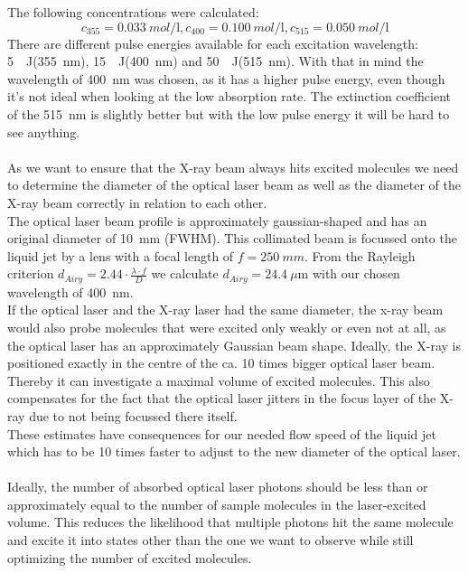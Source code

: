 \documentclass[10pt,a4paper, bibliography=totoc]{scrartcl}
\begin{document}
The following concentrations were calculated:
$$c_{355}=\qty{0.033}{mol\per\l}, c_{400}=\qty{0.100}{mol\per\l}, c_{515}=\qty{0.050}{mol\per\l}$$
There are different pulse energies available for each excitation wavelength: \qty{5}{\mu\J}(\qty{355}{nm}), \qty{15}{\mu\J}(\qty{400}{nm}) and \qty{50}{\mu\J}(\qty{515}{nm}). With that in mind the wavelength of \qty{400}{nm} was chosen, as it has a higher pulse energy, even though it's not ideal when looking at the low absorption rate. The extinction coefficient of the \qty{515}{nm} is slightly better but with the low pulse energy it will be hard to see anything.\\\\
As we want to ensure that the X-ray beam always hits excited molecules we need to determine the diameter of the optical laser beam as well as the diameter of the X-ray beam correctly in relation to each other.\\
The optical laser beam profile is approximately gaussian-shaped and has an original diameter of \qty{10}{mm} (FWHM). This collimated beam is focussed onto the liquid jet by a lens with a focal length of $f=\qty{250}{mm}$. From the Rayleigh criterion $d_{Airy}=2.44\cdot \frac{\lambda\cdot f}{D}$ we calculate $d_{Airy}=\qty{24.4}{\mu\m}$ with our chosen wavelength of \qty{400}{nm}.\\
If the optical laser and the X-ray laser had the same diameter, the x-ray beam would also probe molecules that were excited only weakly or even not at all, as the optical laser has an approximately Gaussian beam shape. Ideally, the X-ray is positioned exactly in the centre of the ca. 10 times bigger optical laser beam. Thereby it can investigate a maximal volume of excited molecules. This also compensates for the fact that the optical laser jitters in the focus layer of the X-ray due to not being focussed there itself.\\
These estimates have consequences for our needed flow speed of the liquid jet which has to be 10 times faster to adjust to the new diameter of the optical laser.\\\\
Ideally, the number of absorbed optical laser photons should be less than or approximately equal to the number of sample molecules in the laser-excited volume. This reduces the likelihood that multiple photons hit the same molecule and excite it into states other than the one we want to observe while still optimizing the number of excited molecules.\\\\
\end{document}
